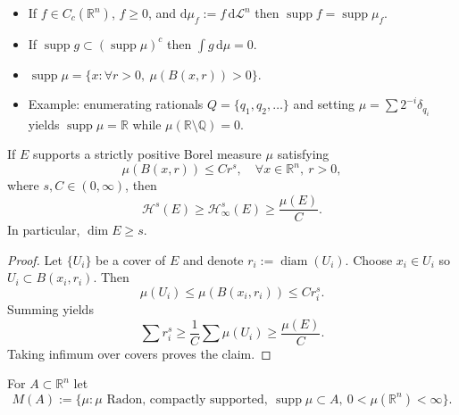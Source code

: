     \begin{remark}
    \begin{itemize}
        \item[(i)] If $f\in C_{c}(\mathbb{R}^{n})$, $f\geq 0$, and $\mathrm{d}\mu _{f}:=f \,\mathrm{d}\mathcal{L}^{n}$ then $\operatorname{supp}f=\operatorname{supp}\mu _{f}$.
        \item[(ii)] If $\operatorname{supp}g\subset (\operatorname{supp}\mu)^{c}$ then $\int g\,\mathrm{d}\mu=0$.
        \item[(iii)] $\operatorname{supp}\mu =\{ x:\forall r>0,\ \mu(B(x,r))>0\}$.
        \item[(iv)] Example: enumerating rationals $Q=\{ q_{1},q_{2},\dots\}$ and setting $\mu=\sum 2^{-i}\delta_{q_{i}}$ yields $\operatorname{supp}\mu=\mathbb{R}$ while $\mu(\mathbb{R}\setminus\mathbb{Q})=0$.
    \end{itemize}
    \end{remark}

    \begin{theorem}
    \label{thm:mass_dist}
    If $E$ supports a strictly positive Borel measure $\mu$ satisfying
        \begin{equation*}
            \mu(B(x,r))\leq C r^{s},\quad\forall x\in \mathbb{R}^{n},\ r>0,
        \end{equation*}
    where $s,C\in(0,\infty)$, then
        \begin{equation*}
            \mathcal{H}^{s}(E)\geq \mathcal{H}^{s}_{\infty}(E)\geq \frac{\mu(E)}{C}.
        \end{equation*}
    In particular, $\dim E\geq s$.
    \end{theorem}

    \begin{proof}
    Let $\{U_{i}\}$ be a cover of $E$ and denote $r_{i}:=\operatorname{diam}(U_{i})$. Choose $x_{i}\in U_{i}$ so $U_{i}\subset B(x_{i},r_{i})$. Then
        \begin{equation*}
            \mu(U_{i})\leq \mu(B(x_{i},r_{i}))\leq C r_{i}^{s}.
        \end{equation*}
    Summing yields
        \begin{equation*}
            \sum r_{i}^{s}\geq \frac{1}{C}\sum \mu(U_{i})\geq \frac{\mu(E)}{C}.
        \end{equation*}
    Taking infimum over covers proves the claim.
    \end{proof}

    \begin{definition}
    For $A\subset \mathbb{R}^{n}$ let
        \begin{equation*}
            M(A):=\{ \mu:\mu \text{ Radon, compactly supported},\ \operatorname{supp}\mu\subset A,\ 0<\mu(\mathbb{R}^{n})<\infty \}.
        \end{equation*}
    \end{definition}


